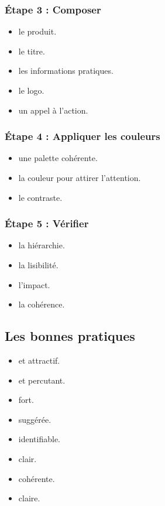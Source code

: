 \subsubsection{Étape 3 : Composer}

\begin{itemize}
    \item {} le produit.
    \item {} le titre.
    \item {} les informations pratiques.
    \item {} le logo.
    \item {} un appel à l'action.
\end{itemize}

\subsubsection{Étape 4 : Appliquer les couleurs}

\begin{itemize}
    \item {} une palette cohérente.
    \item {} la couleur pour attirer l'attention.
    \item {} le contraste.
\end{itemize}

\subsubsection{Étape 5 : Vérifier}

\begin{itemize}
    \item {} la hiérarchie.
    \item {} la lisibilité.
    \item {} l'impact.
    \item {} la cohérence.
\end{itemize}

\subsection{Les bonnes pratiques}

\begin{itemize}
    \item {} et attractif.
    \item {} et percutant.
    \item {} fort.
    \item {} suggérée.
    \item {} identifiable.
    \item {} clair.
    \item {} cohérente.
    \item {} claire.
\end{itemize}

